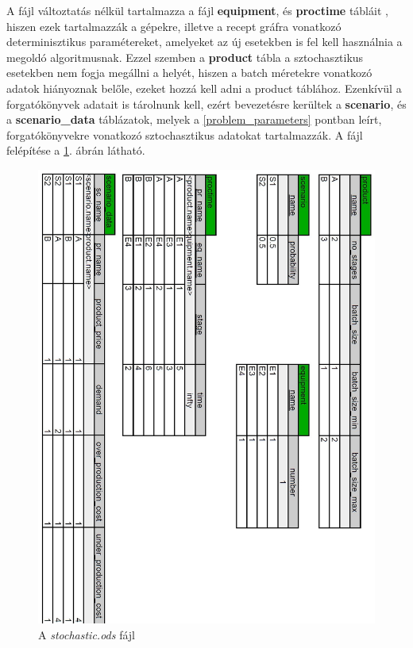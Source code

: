 A  fájl változtatás nélkül tartalmazza a  fájl \textbf{equipment}, és \textbf{proctime} tábláit , hiszen ezek tartalmazzák a gépekre, illetve a recept gráfra vonatkozó determinisztikus paramétereket, amelyeket az új esetekben is fel kell használnia a megoldó algoritmusnak.
Ezzel szemben a \textbf{product} tábla a sztochasztikus esetekben nem fogja megállni a helyét, hiszen a batch méretekre vonatkozó adatok hiányoznak belőle, ezeket hozzá kell adni a product táblához.
Ezenkívül a forgatókönyvek adatait is tárolnunk kell, ezért bevezetésre kerültek a\textbf{ scenario}, és a \textbf{scenario\_data} táblázatok, melyek a \ref{problem_parameters} pontban leírt, forgatókönyvekre vonatkozó sztochasztikus adatokat tartalmazzák.
A  fájl felépítése a \ref{stochastic_odshere}. ábrán látható.
\begin{figure}[H]
\begin{center}
\includegraphics[scale=0.4]{stochasticOds}
\caption{A \textit{stochastic.ods} fájl}
\label{stochastic_odshere}
\end{center}
\end{figure}
